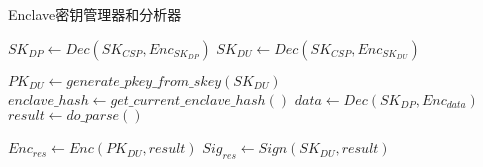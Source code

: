 \begin{algorithm}[h]
  \caption{Enclave密钥管理器和分析器}

  $SK_{DP} \leftarrow Dec(SK_{CSP},Enc_{SK_{DP}})$\;
  $SK_{DU} \leftarrow Dec(SK_{CSP},Enc_{SK_{DU}})$\;

  $PK_{DU} \leftarrow generate\_pkey\_from\_skey(SK_{DU})$\;
  $enclave\_hash \leftarrow get\_current\_enclave\_hash()$\;
  $data \leftarrow Dec(SK_{DP},Enc_{data})$\;
  $result \leftarrow do\_parse()$\;
  
  $Enc_{res} \leftarrow Enc(PK_{DU},result)$\;
  $Sig_{res} \leftarrow Sign(SK_{DU},result)$\;
  
  \;
\label{algo:analysis_enclave}
\end{algorithm} 